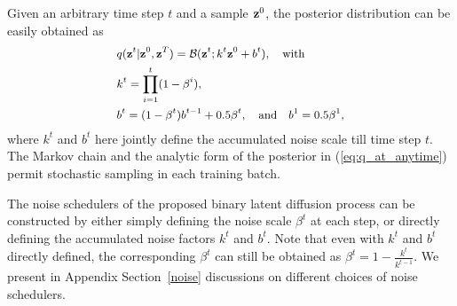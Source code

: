 \documentclass[10pt,twocolumn,letterpaper]{article}
\begin{document}
Given an arbitrary time step $t$ and a sample $\textbf{z}^0$, the posterior distribution can be easily obtained as 
\begin{equation}
\label{eq:q_at_anytime}
\small
\begin{aligned}
     & q(\textbf{z}^t | \textbf{z}^0, \textbf{z}^T) = \mathcal{B}(\textbf{z}^t; k^t \textbf{z}^0 + b^t), \quad \text{with} \\
      & k^t =  \prod_{i=1}^{t} (1 - \beta^i), \\
      & b^t = (1 - \beta^t)b^{t-1} + 0.5 \beta^t, \quad \text{and} \quad b^1 = 0.5 \beta^1,
\end{aligned}
\end{equation}
where $k^t$ and $b^t$ here jointly define the accumulated noise scale till time step $t$. The Markov chain and the analytic form of the posterior in (\ref{eq:q_at_anytime}) permit stochastic sampling in each training batch.

The noise schedulers of the proposed binary latent diffusion process can be constructed by either simply defining the noise scale $\beta^t$ at each step, or directly defining the accumulated noise factors $k^t$ and $b^t$. 
Note that even with $k^t$ and $b^t$ directly defined, the corresponding $\beta^t$ can still be obtained as $\beta^t = 1 - \frac{k^t}{k^{t-1}}$. We present in Appendix Section~\ref{noise} discussions on different choices of noise schedulers. 
\end{document}
